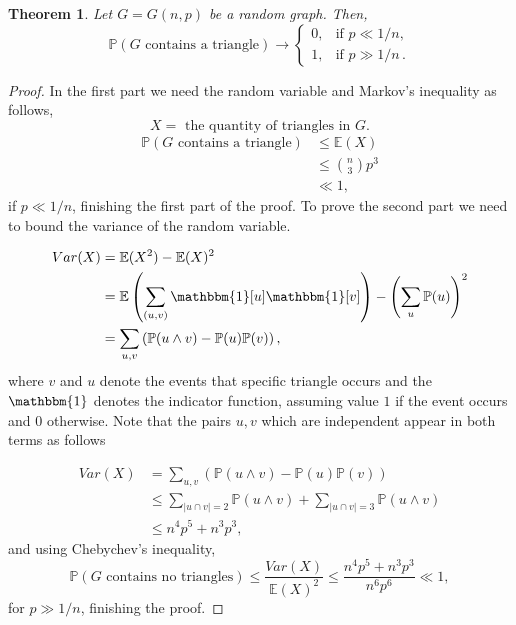 \documentclass[12pt,twoside,a4paper,bibliography=totocnumbered]{book}
\numberwithin{equation}{section}
\newtheorem{theorem}             {Theorem}[section]
\theoremstyle{remark}
\begin{document}
\begin{theorem}
Let $G=G(n,p)$ be a random graph.
Then,
$$
\mathbb{P}(G\text{ contains a triangle}) \rightarrow 
\begin{cases}
		0, &\text{if $p\ll 1/n$},\\
		1, &\text{if $p\gg 1/n$}\,.
\end{cases}
$$
\end{theorem}

\begin{proof}
In the first part we need the random variable and  Markov's inequality as follows,
$$ X = \text{ the quantity of triangles in } G.$$
\begin{align*}
\mathbb{P}(G\text{ contains a triangle}) &\leq \mathbb{E}(X)\\
& \leq \binom{n}{3}p^3 \\
& \ll 1,
\end{align*}
if $ p \ll 1/n$, finishing the first part of the proof. To prove the second part we need to bound the variance of the random variable.

\begin{align*}
Var(X) &= \mathbb{E}(X^2) - \mathbb{E}(X)^2\\
& = \mathbb{E} \left( \sum_{(u, v)} \mathbbm{1}[u]\mathbbm{1}[v] \right) - \left( \sum_u \mathbb{P}(u) \right) ^2\\
& = \sum_{u,v} \left(\mathbb{P}(u \wedge v) - \mathbb{P}(u)\mathbb{P}(v)\right),
\end{align*}
where $v$ and $u$ denote the events that specific triangle occurs and the $\mathbbm{1}$ denotes the indicator function, assuming value $1$ if the event occurs and $0$ otherwise. Note that the pairs $u,v$ which are independent appear in both terms as follows

\begin{align*}
Var(X) &= \sum_{u,v} \left(\mathbb{P}(u \wedge v) - \mathbb{P}(u)\mathbb{P}(v)\right)\\
& \leq \sum_{|u \cap v| = 2}\mathbb{P}(u \wedge v) + \sum_{|u \cap v| = 3}\mathbb{P}(u \wedge v)\\
&\leq n^4 p^5 + n^3 p^3,
\end{align*}
and using Chebychev's inequality,
$$\mathbb{P}(G \text{ contains no triangles}) \leq \frac{Var(X)}{\mathbb{E}(X)^2} \leq \frac{n^4p^5 + n^3p^3 }{n^6p^6} \ll 1,$$
for $p \gg 1/n$, finishing the proof.
 \end{proof}
\end{document}
